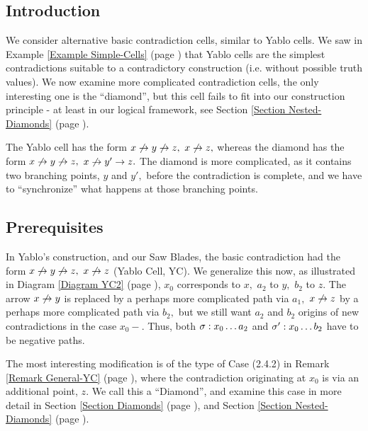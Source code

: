 \label{Section ContradictionCells}
\subsection{
Introduction
}


\ed


We consider alternative basic contradiction cells, similar to Yablo cells.
We saw in Example 
\ref{Example Simple-Cells} (page 
\pageref{Example Simple-Cells})
that Yablo cells are the simplest contradictions suitable
to a contradictory construction (i.e. without possible truth values).
We now examine more complicated contradiction cells, the only
interesting one is the ``diamond'', but this cell fails to fit into our
construction principle - at least in our logical framework, see
Section \ref{Section Nested-Diamonds} (page \pageref{Section Nested-Diamonds}).

The Yablo cell has the form $x \not\rightarrow y \not\rightarrow z,$ $x \not\rightarrow z,$ whereas the
diamond
has the form $x \not\rightarrow y \not\rightarrow z,$ $x \not\rightarrow y' \rightarrow z.$
The diamond is more complicated, as it contains two branching points, $y$
and $y',$
before the contradiction is complete, and we have to ``synchronize''
what happens at those branching points.
\subsection{
Prerequisites
}


In Yablo's construction, and our Saw Blades, the basic contradiction had
the form $x \not\rightarrow y \not\rightarrow z,$ $x \not\rightarrow z$ (Yablo Cell, YC).
We generalize this now, as illustrated in
Diagram 
\ref{Diagram YC2} (page 
\pageref{Diagram YC2}), $x_{0}$ corresponds to $x,$ $a_{2}$ to $y,$
$b_{2}$ to $z.$
The arrow $x \not\rightarrow y$ is replaced by a perhaps more complicated path via
$a_{1},$ $x \not\rightarrow z$
by a perhaps more complicated path via $b_{2},$ but we still want $a_{2}$
and $b_{2}$ origins
of new contradictions in the case $x_{0}-.$ Thus, both $ \sigma:x_{0} \ldots
a_{2}$ and $ \sigma':x_{0} \ldots b_{2}$
have to be negative paths.

The most interesting modification is
of the type of Case (2.4.2)
in Remark 
\ref{Remark General-YC} (page 
\pageref{Remark General-YC}), where the contradiction originating
at $x_{0}$
is via an additional point, $z.$ We call this a ``Diamond'', and examine
this case in more detail in Section 
\ref{Section Diamonds} (page 
\pageref{Section Diamonds}), and
Section \ref{Section Nested-Diamonds} (page \pageref{Section Nested-Diamonds}).

